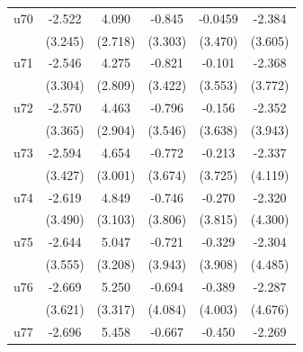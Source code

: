 \begin{table}[htbp]
\begin{tabular}{l*{5}{c}}
\addlinespace
u70                 &      -2.522         &       4.090         &      -0.845         &     -0.0459         &      -2.384         \\
                    &     (3.245)         &     (2.718)         &     (3.303)         &     (3.470)         &     (3.605)         \\
\addlinespace
u71                 &      -2.546         &       4.275         &      -0.821         &      -0.101         &      -2.368         \\
                    &     (3.304)         &     (2.809)         &     (3.422)         &     (3.553)         &     (3.772)         \\
\addlinespace
u72                 &      -2.570         &       4.463         &      -0.796         &      -0.156         &      -2.352         \\
                    &     (3.365)         &     (2.904)         &     (3.546)         &     (3.638)         &     (3.943)         \\
\addlinespace
u73                 &      -2.594         &       4.654         &      -0.772         &      -0.213         &      -2.337         \\
                    &     (3.427)         &     (3.001)         &     (3.674)         &     (3.725)         &     (4.119)         \\
\addlinespace
u74                 &      -2.619         &       4.849         &      -0.746         &      -0.270         &      -2.320         \\
                    &     (3.490)         &     (3.103)         &     (3.806)         &     (3.815)         &     (4.300)         \\
\addlinespace
u75                 &      -2.644         &       5.047         &      -0.721         &      -0.329         &      -2.304         \\
                    &     (3.555)         &     (3.208)         &     (3.943)         &     (3.908)         &     (4.485)         \\
\addlinespace
u76                 &      -2.669         &       5.250         &      -0.694         &      -0.389         &      -2.287         \\
                    &     (3.621)         &     (3.317)         &     (4.084)         &     (4.003)         &     (4.676)         \\
\addlinespace
u77                 &      -2.696         &       5.458         &      -0.667         &      -0.450         &      -2.269         \\

\end{tabular}
\end{table}
